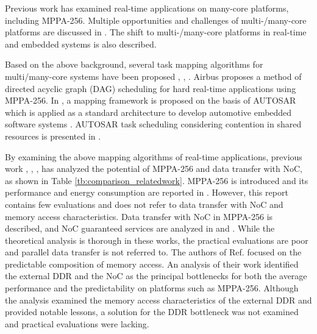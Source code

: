 Previous work has examined real-time applications on many-core platforms, including MPPA-256.
Multiple opportunities and challenges of multi-/many-core platforms are discussed in \cite{saidi2015shift}.
The shift to multi-/many-core platforms in real-time and embedded systems is also described. 

Based on the above background, several task mapping algorithms for multi/many-core systems have been proposed \cite{carle2014static}, \cite{faragardi2014communication}, \cite{perret2016mapping}.
Airbus \cite{perret2016mapping} proposes a method of directed acyclic graph (DAG) scheduling for hard real-time applications using MPPA-256.
In \cite{faragardi2014communication}, a mapping framework is proposed on the basis of AUTOSAR which is applied as a standard architecture to develop automotive embedded software systems \cite{furst2009autosar}.
AUTOSAR task scheduling considering contention in shared resources is presented in \cite{becker2016contention}.

By examining the above mapping algorithms of real-time applications, previous work \cite{deDinechin2014GSN}, \cite{denet2017work}, \cite{kanter2015kalray}, \cite{perret2016predictable} has analyzed the potential of MPPA-256 and data transfer with NoC, as shown in Table \ref{tb:comparison_relatedwork}.
MPPA-256 is introduced and its performance and energy consumption are reported in \cite{kanter2015kalray}.
However, this report contains few evaluations and does not refer to data transfer with NoC and memory access characteristics.
Data transfer with NoC in MPPA-256 is described, and NoC guaranteed services are analyzed in \cite{deDinechin2014GSN} and \cite{denet2017work}.
While the theoretical analysis is thorough in these works, the practical evaluations are poor and parallel data transfer is not referred to.
The authors of Ref. \cite{perret2016predictable} focused on the predictable composition of memory access.
An analysis of their work identified the external DDR and the NoC as the principal bottlenecks for both the average performance and the predictability on platforms such as MPPA-256.
Although the analysis examined the memory access characteristics of the external DDR and provided notable lessons, a solution for the DDR bottleneck was not examined and practical evaluations were lacking.

